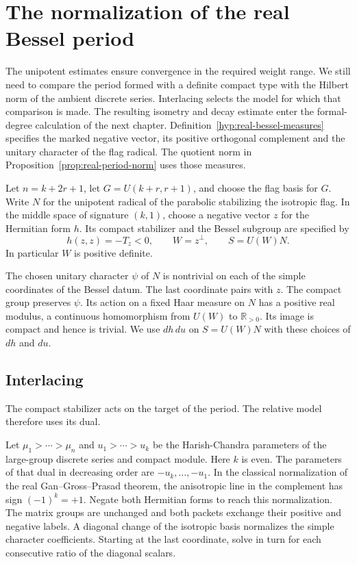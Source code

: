 \section{The normalization of the real Bessel period}
\label{sec:bessel-periods}

The unipotent estimates ensure convergence in the required weight range. We still need to compare the period formed with a definite compact type with the Hilbert norm of the ambient discrete series. Interlacing selects the model for which that comparison is made. The resulting isometry and decay
estimate enter the formal-degree calculation of the next
chapter. Definition~\ref{hyp:real-bessel-measures} specifies the marked negative vector, its positive orthogonal complement and the unitary character of the flag radical. The quotient norm in Proposition~\ref{prop:real-period-norm} uses those measures.

\begin{paramdefinition}\label{hyp:real-bessel-measures}
Let \(n=k+2r+1\), let \(G=U(k+r,r+1)\), and choose the flag
basis for \(G\). Write \(N\) for the unipotent radical of the parabolic stabilizing the isotropic flag. In the middle space of signature \((k,1)\), choose a negative vector \(z\) for the Hermitian form \(h\). Its compact stabilizer and the Bessel subgroup are specified by
\[
      h(z,z)=-T_z<0,\qquad W=z^\perp,\qquad S=U(W)N .
\]
In particular \(W\) is positive definite.

The chosen
unitary character \(\psi\) of \(N\) is nontrivial on each of the
simple coordinates of the Bessel datum. The last coordinate pairs
with \(z\). The compact group preserves \(\psi\). Its action on a fixed
Haar measure on \(N\) has a positive real modulus, a continuous
homomorphism from \(U(W)\) to \(\mathbb R_{>0}\). Its image is
compact and hence is trivial. We use \(dh\,du\) on \(S=U(W)N\)
with these choices of \(dh\) and \(du\).
\end{paramdefinition}

\subsection{Interlacing}

The compact stabilizer acts on the target of the period. The relative model therefore uses its dual.

Let \(\mu_1>\cdots>\mu_n\) and \(u_1>\cdots>u_k\) be the
Harish-Chandra parameters of the large-group discrete series and
compact module. Here \(k\) is even. The parameters of that dual in decreasing order are \(-u_k,\ldots,-u_1\). In the classical normalization of the
real Gan--Gross--Prasad theorem, the anisotropic line in the
complement has sign \((-1)^k=+1\). Negate both Hermitian forms
to reach this normalization. The matrix groups are unchanged
and both packets exchange their positive and negative labels.
A diagonal change of the isotropic basis normalizes the simple
character coefficients. Starting at the last coordinate, solve
in turn for each consecutive ratio of the diagonal scalars.

